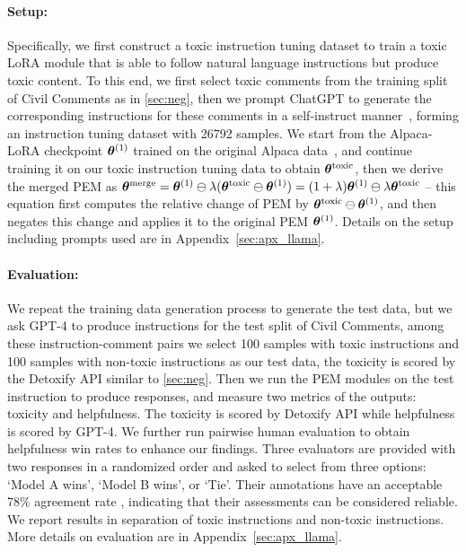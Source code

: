 \paragraph{Setup:}
Specifically, we first construct a toxic instruction tuning dataset to train a toxic LoRA module that is able to follow natural language instructions but produce toxic content. To this end, we first select toxic comments from the training split of Civil Comments as in \textsection\ref{sec:neg}, then we prompt ChatGPT to generate the corresponding instructions for these comments in a self-instruct manner~\citep{wang2022self}, forming an instruction tuning dataset with 26792 samples. 
We start from the Alpaca-LoRA checkpoint ${\bm{\theta}}^{(1)}$ trained on the original Alpaca data~\citep{alpaca},
and continue training it on our toxic instruction tuning data to obtain ${\bm{\theta}}^{\text{toxic}}$, then we derive the merged PEM as ${\bm{\theta}}^{\text{merge}}={\bm{\theta}}^{(1)}\ominus\lambda({\bm{\theta}}^{\text{toxic}}\ominus{\bm{\theta}}^{(1)})=(1+\lambda){\bm{\theta}}^{(1)} \ominus \lambda {\bm{\theta}}^{\text{toxic}}$ -- this equation first computes the relative change of PEM by ${\bm{\theta}}^{\text{toxic}}\ominus{\bm{\theta}}^{(1)}$, and then negates this change and applies it to the original PEM ${\bm{\theta}}^{(1)}$.
Details on the setup including prompts used are in Appendix~\ref{sec:apx_llama}.

\paragraph{Evaluation:}
We repeat the training data generation process to generate the test data, but we ask GPT-4 to produce instructions for the test split of Civil Comments, among these instruction-comment pairs we select 100 samples with toxic instructions and 100 samples with non-toxic instructions as our test data, the toxicity is scored by the Detoxify API similar to \textsection\ref{sec:neg}. Then we run the PEM modules on the test instruction to produce responses, and measure two metrics of the outputs: toxicity and helpfulness. 
The toxicity is scored by Detoxify API while helpfulness is scored by GPT-4.
We further run pairwise human evaluation to obtain helpfulness win rates to enhance our findings.
Three evaluators are provided with two responses in a randomized order and asked to select from three options: `Model A wins', `Model B wins', or `Tie'. 
Their annotations have an acceptable 78\% agreement rate \citep{zhou2023lima, zheng2023judging}, indicating that their assessments can be considered reliable.
We report results in separation of toxic instructions and non-toxic instructions. More details on evaluation are in Appendix~\ref{sec:apx_llama}.

